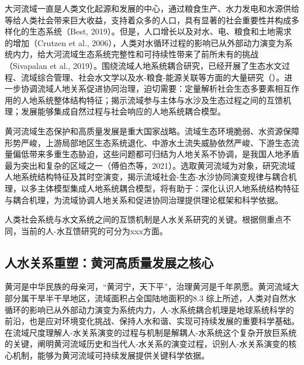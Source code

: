 大河流域一直是人类文化起源和发展的中心，通过粮食生产、水力发电和水源供给等给人类社会带来巨大收益，支持着众多的人口，具有显著的社会重要性并构成多样化的生态系统（Best, 2019）。但是，人口增长以及对水、电、粮食和土地需求的增加（Crutzen et al., 2006），人类对水循环过程的影响已从外部动力演变为系统内力，给大河流域生态系统完整性和可持续性带来了前所未有的挑战（Sivapalan et al., 2019）。围绕流域人地系统耦合研究，已经开展了生态水文过程、流域综合管理、社会水文学以及水-粮食-能源关联等方面的大量研究（）。进一步协调流域人地关系促进协同治理，迫切需要：定量解析社会生态多要素相互作用的人地系统整体结构特征；揭示流域参与主体与水沙及生态过程之间的互馈机理；发展能够集成自然过程与社会响应的人地系统耦合模型。

黄河流域生态保护和高质量发展是重大国家战略。流域生态环境脆弱、水资源保障形势严峻，上游局部地区生态系统退化、中游水土流失威胁依然严峻、下游生态流量偏低带来多重生态胁迫，这些问题都可归结为人地关系不协调，是我国人地矛盾最为突出和复杂的区域之一（傅伯杰等，2021）。选取黄河流域为对象，研究流域人地系统结构特征及其时空演变，揭示流域社会-生态-水沙协同演变规律与耦合机理，以多主体模型集成人地系统耦合模型，将有助于：深化认识人地系统结构特征与耦合机理，为流域协调人地关系和促进协同治理提供理论框架和科学依据。

人类社会系统与水文系统之间的互馈机制是人水关系研究的关键。根据侧重点不同，当前的人-水互馈研究的可分为xxx方面。

\subsection{人水关系重塑：黄河高质量发展之核心}

黄河是中华民族的母亲河，“黄河宁，天下平”，治理黄河是千年夙愿。黄河流域大部分属干旱半干旱地区，流域面积占全国陆地面积的8.3%
综上所述，人类对自然水循环的影响已从外部动力演变为系统内力，人-水系统耦合机理是地球系统科学的前沿，也是应对环境变化挑战、保持人水和谐、实现可持续发展的重要科学基础。在流域尺度理解人-水关系演变的过程与机制是解耦人-水系统这个复杂开放巨系统的关键，阐明黄河流域历史和当代人-水关系的演变过程，识别人-水关系演变的核心机制，能够为黄河流域可持续发展提供关键科学依据。

